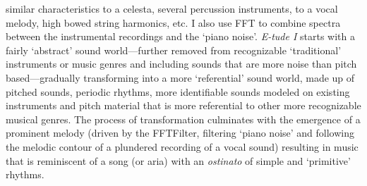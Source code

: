similar characteristics to a celesta, several percussion instruments, to a vocal melody, high bowed string harmonics, etc. I also use FFT to combine spectra between the instrumental recordings and the `piano noise'. \emph{E-tude I} starts with a fairly `abstract' sound world---further removed from recognizable `traditional' instruments or music genres and including sounds that are more noise than pitch based---gradually transforming into a more `referential' sound world, made up of pitched sounds, periodic rhythms, more identifiable sounds modeled on existing instruments and pitch material that is more referential to other more recognizable musical genres. The process of transformation culminates with the emergence of a prominent melody (driven by the FFTFilter, filtering `piano noise' and following the melodic contour of a plundered recording of a vocal sound) resulting in music that is reminiscent of a song (or aria) with an \emph{ostinato} of simple and `primitive' rhythms.

